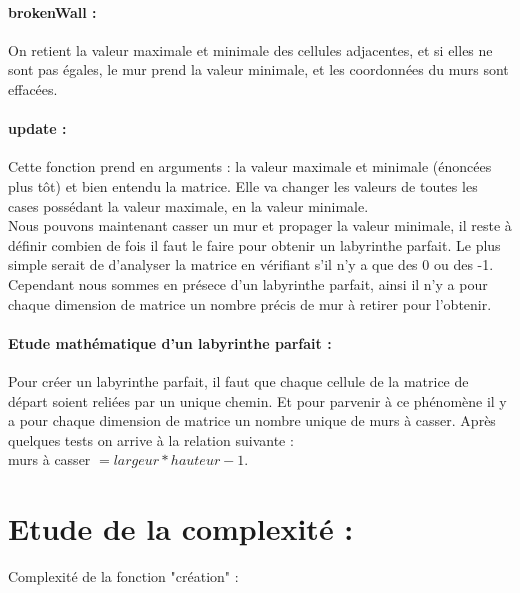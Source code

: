 \documentclass[12pt]{report}
\begin{document}
	\paragraph{brokenWall :} On retient la valeur maximale et minimale des cellules adjacentes, et si elles ne sont pas égales, le mur prend la valeur minimale, et les coordonnées du murs sont effacées.
	\paragraph{update :} Cette fonction prend en arguments : la valeur maximale et minimale (énoncées plus tôt) et bien entendu la matrice. Elle va changer les valeurs de toutes les cases possédant la valeur maximale, en la valeur minimale. \\
	Nous pouvons maintenant casser un mur et propager la valeur minimale, il reste à définir combien de fois il faut le faire pour obtenir un labyrinthe parfait. Le plus simple serait de d'analyser la matrice en vérifiant s'il n'y a que des 0 ou des -1. Cependant nous sommes en présece d'un labyrinthe parfait, ainsi il n'y a pour chaque dimension de matrice un nombre précis de mur à retirer pour l'obtenir.
	
	\paragraph{Etude mathématique d'un labyrinthe parfait :} Pour créer un labyrinthe parfait, il faut que chaque cellule de la matrice de départ soient reliées par un unique chemin. Et pour parvenir à ce phénomène il y a pour chaque dimension de matrice un nombre unique de murs à casser. Après quelques tests on arrive à la relation suivante : \\
	murs à casser $= largeur * hauteur -1$.
\section{Etude de la complexité :}
Complexité de la fonction "création" : \\
\end{document}
